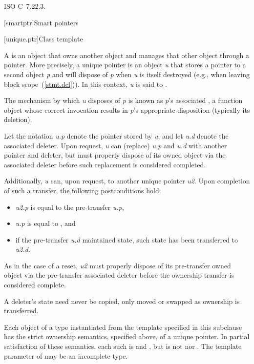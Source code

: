 \xref ISO C~7.22.3.

[smartptr]{Smart pointers}

[unique.ptr]{Class template }

\pnum
A  is an object that owns another object and
manages that other object through a pointer. More precisely, a unique pointer
is an object \textit{u} that stores a pointer to a second object \textit{p} and
will dispose of \textit{p} when \textit{u} is itself destroyed (e.g., when
leaving block scope~(\ref{stmt.dcl})). In this context, \textit{u} is said
to  .

\pnum
The mechanism by which \textit{u} disposes of \textit{p} is known as
\textit{p}'s associated , a function object whose correct
invocation results in \textit{p}'s appropriate disposition (typically its deletion).

\pnum
Let the notation \textit{u.p} denote the pointer stored by \textit{u}, and
let \textit{u.d} denote the associated deleter. Upon request, \textit{u} can
 (replace) \textit{u.p} and \textit{u.d} with another pointer and
deleter, but must properly dispose of its owned object via the associated
deleter before such replacement is considered completed.

\pnum
Additionally, \textit{u} can, upon request,  to another
unique pointer \textit{u2}. Upon completion of such a transfer, the following
postconditions hold:

\begin{itemize}
\item \textit{u2.p} is equal to the pre-transfer \textit{u.p},
\item \textit{u.p} is equal to , and
\item if the pre-transfer \textit{u.d} maintained state, such state has been
transferred to \textit{u2.d}.
\end{itemize}

As in the case of a reset, \textit{u2} must properly dispose of its pre-transfer
owned object via the pre-transfer associated deleter before the ownership
transfer is considered complete. \begin{note} A deleter's state need never be
copied, only moved or swapped as ownership is transferred. \end{note}

\pnum
Each object of a type  instantiated from the  template
specified in this subclause has the strict ownership semantics, specified above,
of a unique pointer. In partial satisfaction of these semantics, each such 
is  and , but is not
 nor .
The template parameter  of  may be an incomplete type.

